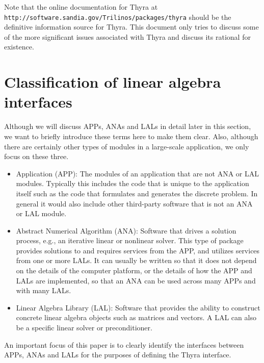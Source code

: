 \documentclass[pdf,ps2pdf,11pt]{SANDreport}
\begin{document}
Note that the online documentation for Thyra at
{}\texttt{http://software.sandia.gov/Trilinos/packages/thyra} should be the
definitive information source for Thyra.  This document only tries to discuss
some of the more significant issues associated with Thyra and discuss its
rational for existence.

%
\section{Classification of linear algebra interfaces}
\label{tsfcore:sec:classification_of_lin_alg_itfc}
%

Although we will discuss APPs, ANAs and LALs in detail later in this
section, we want to briefly introduce these terms here to make them
clear.  Also, although there are certainly other types of modules in a
large-scale application, we only focus on these three.
\begin{itemize}
\item Application (APP):  The modules of an application that are not
ANA or LAL modules.  Typically this includes the code that is unique
to the application itself such as the code that formulates and
generates the discrete problem.  In general it would also include
other third-party software that is not an ANA or LAL module.
\item Abstract Numerical Algorithm (ANA):  Software that drives a
solution process, e.g., an iterative linear or nonlinear solver.  This
type of package provides solutions to and requires services from the
APP, and utilizes services from one or more LALs.  It can usually be
written so that it does not depend on the details of the computer
platform, or the details of how the APP and LALs are implemented, so
that an ANA can be used across many APPs and with many LALs.
\item Linear Algebra Library (LAL): Software that provides the
ability to construct
concrete linear algebra objects such as matrices and vectors.
A LAL can also be a specific linear solver or preconditioner.
\end{itemize}

An important focus of this paper is to clearly identify the interfaces
between APPs, ANAs and LALs for the purposes of defining the Thyra
interface.
\end{document}
